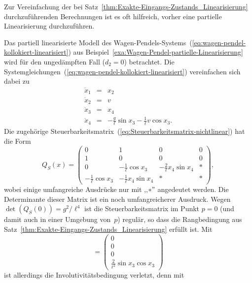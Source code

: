 Zur Vereinfachung der bei Satz~\ref{thm:Exakte-Eingangs-Zustands_Linearisierung}
durchzuführenden Berechnungen ist es oft hilfreich, vorher eine partielle
Linearisierung durchzuführen.

\begin{example}
\label{exa:wagen-pendel-system-zustandslinearisierbarkeit}Das partiell
linearisierte Modell des Wagen-Pendels-Systems~(\ref{eq:wagen-pendel-kollokiert-linearisiert})
aus Beispiel~\ref{exa:Wagen-Pendel-partielle-Linearisierung} wird
für den ungedämpften Fall ($d_{2}=0$) betrachtet. Die Systemgleichungen~(\ref{eq:wagen-pendel-kollokiert-linearisiert})
vereinfachen sich dabei zu 
\begin{equation}
\begin{array}{lcl}
\dot{x}_{1} & = & x_{2}\\
\dot{x}_{2} & = & v\\
\dot{x}_{3} & = & x_{4}\\
\dot{x}_{4} & = & -\frac{g}{\ell}\sin x_{3}-\frac{1}{\ell}v\cos x_{3}.
\end{array}\label{eq:wagen-pendel-partiell-linearisiert-reibungsfrei}
\end{equation}
Die zugehörige Steuerbarkeitsmatrix~(\ref{eq:Steuerbarkeitsmatrix-nichtlinear})
hat die Form 
\[
Q_{S}(x)=\left(\begin{array}{cccc}
0 & 1 & 0 & 0\\
1 & 0 & 0 & 0\\
0 & -\frac{1}{\ell}\cos x_{3} & -\frac{2}{\ell}x_{4}\sin x_{4} & *\\
-\frac{1}{\ell}\cos x_{3} & -\frac{1}{\ell}x_{4}\sin x_{4} & * & *
\end{array}\right),
\]
wobei einige umfangreiche Ausdrücke nur mit ,,$*"$ angedeutet werden.
Die Determinante dieser Matrix ist ein noch umfangreicherer Ausdruck.
Wegen $\det(Q_{S}(0))=g^{2}/\ell^{4}$ ist die Steuerbarkeitsmatrix
im Punkt $p=0$ (und damit auch in einer Umgebung von~$p$) regulär,
so dass die Rangbedingung aus Satz~\ref{thm:Exakte-Eingangs-Zustands_Linearisierung}
erfüllt ist. Mit 
\begin{equation}
[g,\ad_{-f}g]=\left(\begin{array}{c}
0\\
0\\
0\\
\frac{2}{\ell^{2}}\sin x_{3}\cos x_{3}
\end{array}\right)\label{eq:wagen-pendel-VF-nicht-in-Delta3}
\end{equation}
ist allerdings die Involutivitätsbedingung verletzt, denn mit 

\end{example}
